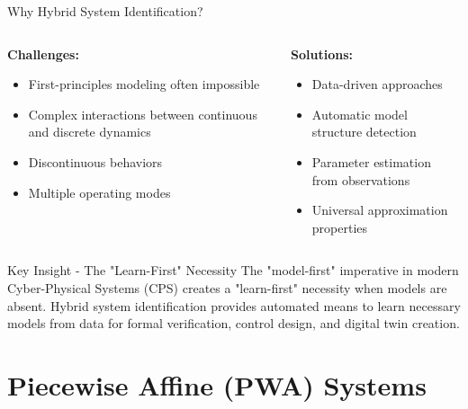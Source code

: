 \documentclass[aspectratio=169]{beamer}
\begin{document}
\begin{frame}{Why Hybrid System Identification?}
\begin{columns}[t]
\begin{column}{0.5\textwidth}
\textbf{Challenges:}
\begin{itemize}
\item First-principles modeling often impossible
\item Complex interactions between continuous and discrete dynamics
\item Discontinuous behaviors
\item Multiple operating modes
\end{itemize}
\end{column}
\begin{column}{0.5\textwidth}
\textbf{Solutions:}
\begin{itemize}
\item Data-driven approaches
\item Automatic model structure detection
\item Parameter estimation from observations
\item Universal approximation properties
\end{itemize}
\end{column}
\end{columns}

\vspace{0.5cm}
\begin{alertblock}{Key Insight - The "Learn-First" Necessity}
The "model-first" imperative in modern Cyber-Physical Systems (CPS) creates a "learn-first" necessity when models are absent. Hybrid system identification provides automated means to learn necessary models from data for formal verification, control design, and digital twin creation.
\end{alertblock}
\end{frame}

\section{Piecewise Affine (PWA) Systems}
\end{document}
